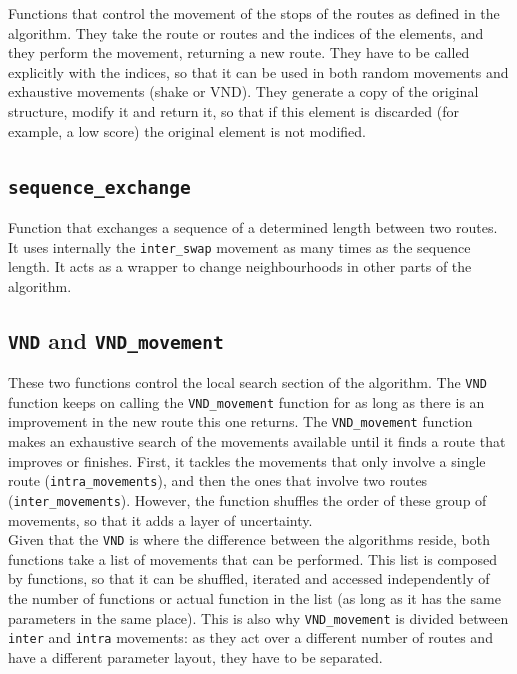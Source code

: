 \documentclass[11pt]{article}
\begin{document}
Functions that control the movement of the stops of the routes as defined in the algorithm. They take the route or routes and the indices of the elements, and they perform the movement, returning a new route. They have to be called explicitly with the indices, so that it can be used in both random movements and exhaustive movements (shake or VND). They generate a copy of the original structure, modify it and return it, so that if this element is discarded (for example, a low score) the original element is not modified. \\

\subsection{\texttt{sequence\_exchange}}

Function that exchanges a sequence of a determined length between two routes. It uses internally the \texttt{inter\_swap} movement as many times as the sequence length. It acts as a wrapper to change neighbourhoods in other parts of the algorithm. \\

\subsection{\texttt{VND} and \texttt{VND\_movement}}

These two functions control the local search section of the algorithm. The \texttt{VND} function keeps on calling the \texttt{VND\_movement} function for as long as there is an improvement in the new route this one returns. The \texttt{VND\_movement} function makes an exhaustive search of the movements available until it finds a route that improves or finishes. First, it tackles the movements that only involve a single route (\texttt{intra\_movements}), and then the ones that involve two routes (\texttt{inter\_movements}). However, the function shuffles the order of these group of movements, so that it adds a layer of uncertainty. \\

Given that the \texttt{VND} is where the difference between the algorithms reside, both functions take a list of movements that can be performed. This list is composed by functions, so that it can be shuffled, iterated and accessed independently of the number of functions or actual function in the list (as long as it has the same parameters in the same place). This is also why \texttt{VND\_movement} is divided between \texttt{inter} and \texttt{intra} movements: as they act over a different number of routes and have a different parameter layout, they have to be separated. \\
\end{document}
